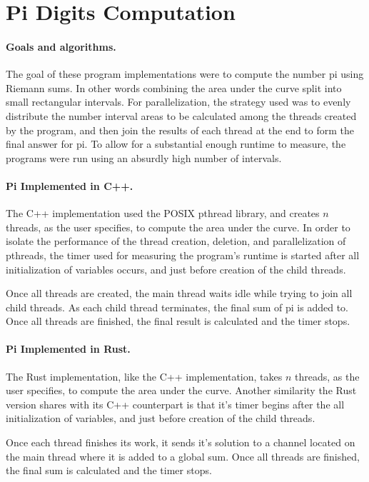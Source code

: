 \section{Pi Digits Computation}
\paragraph{Goals and algorithms.}
The goal of these program implementations were to compute the number pi using
Riemann sums. In other words combining the area under the curve split into small
rectangular intervals. For
parallelization, the strategy used was to evenly distribute the
number interval areas to be calculated among the threads created by the
program, and then join the results of each thread at the end to form the final
answer for pi. To allow for a substantial enough runtime to measure, the
programs were run using an absurdly high number of intervals.

\paragraph{Pi Implemented in C++.}
The C++ implementation used the POSIX pthread library, and creates $n$
threads, as the user specifies, to compute the area under the curve. In order
to isolate the performance of the thread creation, deletion, and parallelization
of pthreads, the timer used for measuring the program's runtime is started after
all initialization of variables occurs, and just before creation of the child
threads.

Once all
threads are created, the main thread waits idle while trying to join all child
threads. As each child thread terminates, the final sum of pi is added to. Once
all threads are finished, the final result is calculated and the timer stops.

\paragraph{Pi Implemented in Rust.}
The Rust implementation, like the C++ implementation, takes $n$ threads, as the
user specifies, to compute the area under the curve. Another similarity the Rust
version shares with its C++ counterpart is that it's timer begins after the all
initialization of variables, and just before creation of the child threads.

Once each thread finishes its work, it sends it's solution to a channel located
on the main thread where it is added to a global sum. Once all threads are
finished, the final sum is calculated and the timer stops.

